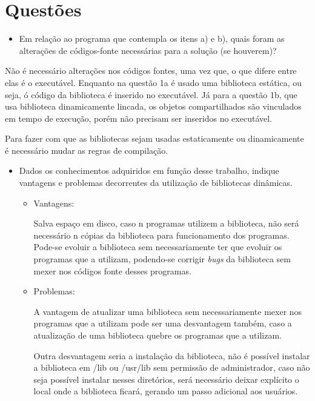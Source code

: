 \chapter[Questões]{Questões}

\begin{itemize}
	\item Em relação ao programa que contempla os itens a) e b), quais foram as alterações
	de códigos-fonte necessárias para a solução (se houverem)?
\end{itemize}

Não é necessário alterações nos códigos fontes, uma vez que, o que difere entre elas é o executável. Enquanto na 	questão 1a é usado uma biblioteca estática, ou seja, ó código da biblioteca é inserido no executável. Já para a questão 1b, que usa biblioteca dinamicamente lincada, os objetos compartilhados são vinculados em tempo de execução, porém não precisam ser inseridos no executável.

Para fazer com que as bibliotecas sejam usadas estaticamente ou dinamicamente é necessário mudar as regras de compilação.

\begin{itemize}
	\item Dados os conhecimentos adquiridos em função desse trabalho, indique vantagens e problemas decorrentes da utilização de bibliotecas dinâmicas.

	\begin{itemize}

	\item Vantagens:

	Salva espaço em disco, caso n programas utilizem a biblioteca, não será necessário n cópias da biblioteca para funcionamento dos programas.
	Pode-se evoluir a biblioteca sem necessariamente ter que evoluir os programas que a utilizam, podendo-se corrigir \textit{bugs} da biblioteca sem mexer nos códigos fonte desses programas.

	\item Problemas:

	A vantagem de atualizar uma biblioteca sem necessariamente mexer nos programas que a utilizam pode ser uma desvantagem também, caso a atualização de uma biblioteca quebre os programas que a utilizam.

	Outra desvantagem seria a instalação da biblioteca, não é possível instalar a biblioteca em /lib ou /usr/lib sem permissão de administrador, caso não seja possível instalar nesses diretórios, será necessário deixar explícito o local onde a biblioteca ficará, gerando um passo adicional aos usuários.

	\end{itemize}

\end{itemize}


